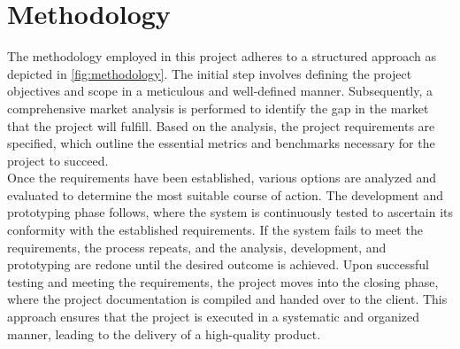 \section{Methodology}
The methodology employed in this project adheres to a structured approach as depicted in \autoref{fig:methodology}.
The initial step involves defining the project objectives and scope in a meticulous and well-defined manner.
Subsequently, a comprehensive market analysis is performed to identify the gap in the market that the project will fulfill.
Based on the analysis, the project requirements are specified, which outline the essential metrics and benchmarks necessary for the project to succeed.
\\
Once the requirements have been established, various options are analyzed and evaluated to determine the most suitable course of action.
The development and prototyping phase follows, where the system is continuously tested to ascertain its conformity with the established requirements.
If the system fails to meet the requirements, the process repeats,
and the analysis, development, and prototyping are redone until the desired outcome is achieved.
Upon successful testing and meeting the requirements, the project moves into the closing phase,
where the project documentation is compiled and handed over to the client.
This approach ensures that the project is executed in a systematic and organized manner,
leading to the delivery of a high-quality product.

